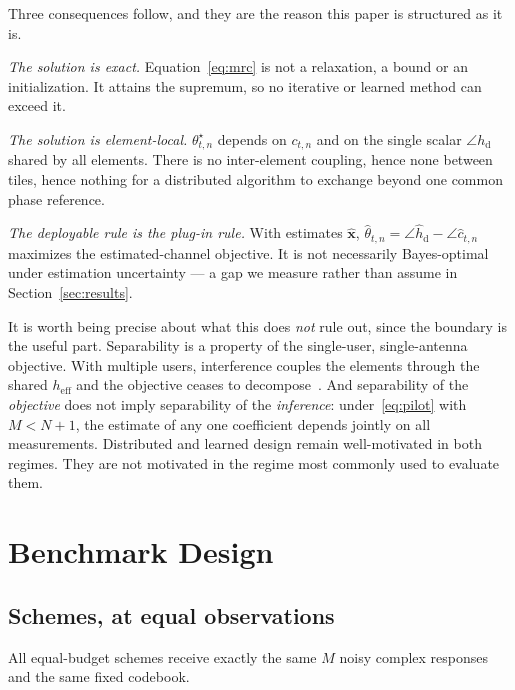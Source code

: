 \documentclass[journal]{IEEEtran}
\begin{document}
Three consequences follow, and they are the reason this paper is structured as it is.

\emph{The solution is exact.} Equation~\eqref{eq:mrc} is not a relaxation, a bound or an initialization. It attains the supremum, so no iterative or learned method can exceed it.

\emph{The solution is element-local.} $\theta^{\star}_{t,n}$ depends on $c_{t,n}$ and on the single scalar $\angle h_{\mathrm{d}}$ shared by all elements. There is no inter-element coupling, hence none between tiles, hence nothing for a distributed algorithm to exchange beyond one common phase reference.

\emph{The deployable rule is the plug-in rule.} With estimates $\hat{\bm{x}}$, $\hat\theta_{t,n}=\angle\hat h_{\mathrm{d}}-\angle\hat c_{t,n}$ maximizes the estimated-channel objective. It is not necessarily Bayes-optimal under estimation uncertainty --- a gap we measure rather than assume in Section~\ref{sec:results}.

It is worth being precise about what this does \emph{not} rule out, since the boundary is the useful part. Separability is a property of the single-user, single-antenna objective. With multiple users, interference couples the elements through the shared $h_{\mathrm{eff}}$ and the objective ceases to decompose~\cite{guo2020,huang2020drl}. And separability of the \emph{objective} does not imply separability of the \emph{inference}: under~\eqref{eq:pilot} with $M<N+1$, the estimate of any one coefficient depends jointly on all measurements. Distributed and learned design remain well-motivated in both regimes. They are not motivated in the regime most commonly used to evaluate them.

\section{Benchmark Design}
\label{sec:bench}

\subsection{Schemes, at equal observations}
All equal-budget schemes receive exactly the same $M$ noisy complex responses and the same fixed codebook.
\end{document}
